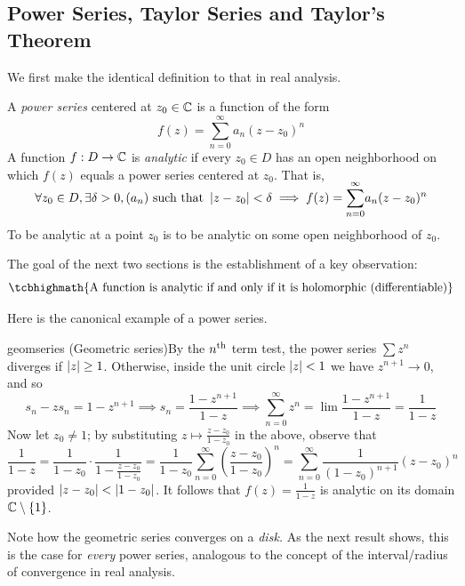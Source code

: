 \goodbreak



\subsection{Power Series, Taylor Series and Taylor's Theorem}

We first make the identical definition to that in real analysis.


\begin{defn}{}{}
A \emph{power series} centered at $z_0\in\mathbb{C}$ is a function of the form
\[f(z)=\sum_{n=0}^\infty a_n(z-z_0)^n\]
A function $f:D\to\mathbb{C}$ is \emph{analytic} if every $z_0\in D$ has an open neighborhood on which $f(z)$ equals a power series centered at $z_0$. That is,
\[\forall z_0\in D,\exists\delta>0,(a_n)\text{ such that }\left| z-z_0\right|<\delta\implies f(z)=\smash[t]{\sum_{n=0}^\infty} a_n(z-z_0)^n\]
To be analytic at a point $z_0$ is to be analytic on some open neighborhood of $z_0$.
\end{defn}
The goal of the next two sections is the establishment of a key observation:
\[\tcbhighmath{\text{A function is analytic if and only if it is holomorphic (differentiable)}}
\]

Here is the canonical example of a power series.

\begin{example}{}{geomseries}
(Geometric series)\quad By the $n\textsuperscript{th}$ term test, the power series $\sum\limits z^n$ diverges if $\left| z\right|\ge 1$. Otherwise, inside the unit circle $\left| z\right|<1$ we have $z^{n+1}\to 0$, and so
\[s_n-zs_n=1-z^{n+1}\implies s_n=\frac{1-z^{n+1}}{1-z} \implies \sum\limits_{n=0}^\infty z^n =\lim\frac{1-z^{n+1}}{1-z}=\frac 1{1-z}\]
Now let $z_0\neq 1$; by substituting $z\mapsto\frac{z-z_0}{1-z_0}$ in the above, observe that
\[\frac 1{1-z} =\frac 1{1-z_0}\cdot \frac 1{1-\frac{z-z_0}{1-z_0}}=\frac 1{1-z_0}\sum_{n=0}^\infty \left(\frac{z-z_0}{1-z_0}\right)^n =\sum_{n=0}^\infty \frac 1{(1-z_0)^{n+1}}(z-z_0)^n\]
provided $\left| z-z_0\right|<\left| 1-z_0\right|$. It follows that $f(z)=\frac 1{1-z}$ is analytic on its domain $\mathbb{C}\setminus\{1\}$.
\end{example}

Note how the geometric series converges on a \emph{disk.} As the next result shows, this is the case for \emph{every} power series, analogous to the concept of the interval/radius of convergence in real analysis.


